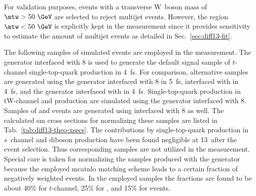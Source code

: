 For validation purposes, events with a transverse W~boson mass of $\mtw>50~\GeV$ are selected to reject multijet events. However, the region $\mtw<50~\GeV$ is explicitly kept in the measurement since it provides sensitivity to estimate the amount of multijet events as detailed in Sec.~\ref{sec:diff13-fit}.

The following samples of simulated events are employed in the measurement. The \MGAMC generator interfaced with \PYTHIA{}8 is used to generate the default signal sample of $t$-channel single-top-quark production in 4~\gls{fs}. For comparison, alternative samples are generated using the \MGAMC generator interfaced with \PYTHIA{}8 in 5~\gls{fs}, \MGAMC interfaced with \HERWIG in 4~\gls{fs}, and the \POWHEG generator interfaced with \PYTHIA in 4~\gls{fs}. Single-top-quark production in tW-channel and \ttbar production are simulated using the \POWHEG generator interfaced with \PYTHIA{}8. Samples of \wjets and \zjets events are generated using \MGAMC interfaced with \PYTHIA{}8 as well. The calculated \gls{sm} cross sections for normalizing these samples are listed in Tab.~\ref{tab:diff13-theo-xsecs}. The contributions by single-top-quark production in $s$~channel and diboson production have been found negligible at 13~\TeV after the event selection. Thus corresponding samples are not utilized in the measurement. Special care is taken for normalizing the samples produced with the \MGAMC generator because the employed \gls{mcatnlo} matching scheme leads to a certain fraction of negatively weighted events. In the employed samples the fractions are found to be about 40\% for $t$-channel, 25\% for \zjets, and 15\% for \wjets events.


